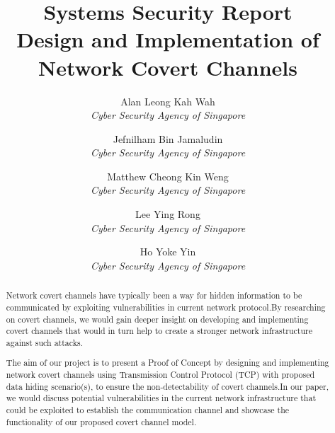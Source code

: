 \documentclass[letterpaper,twocolumn,10pt]{article}
\begin{document}

\date{}

\title{\Large \bf Systems Security Report\\Design and Implementation of Network Covert Channels}

\author{
{\rm Alan Leong Kah Wah}\\
\emph{Cyber Security Agency of Singapore}
\and
{\rm Jefnilham Bin Jamaludin}\\
\emph{Cyber Security Agency of Singapore}
\and
{\rm Matthew Cheong Kin Weng}\\
\emph{Cyber Security Agency of Singapore}
\and
{\rm Lee Ying Rong}\\
\emph{Cyber Security Agency of Singapore}
\and
{\rm Ho Yoke Yin}\\
\emph{Cyber Security Agency of Singapore}
} %


\maketitle



\begin{abstract}
Network covert channels have typically been a way for hidden information to be communicated by exploiting vulnerabilities in current network protocol.By researching on covert channels, we would gain deeper insight on developing and implementing covert channels that would in turn help to create a stronger network infrastructure against such attacks.

The aim of our project is to present a Proof of Concept by designing and implementing network covert channels using Transmission Control Protocol (TCP) with proposed data hiding scenario(s), to ensure the non-detectability of covert channels.In our paper, we would discuss potential vulnerabilities in the current network infrastructure that could be exploited to establish the communication channel and showcase the functionality of our proposed covert channel model.
\end{abstract}
\end{document}
